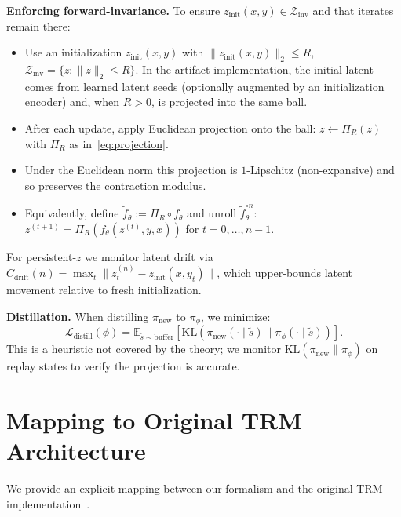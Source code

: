 \documentclass{article}
\theoremstyle{plain}
\theoremstyle{definition}
\theoremstyle{remark}
\newcommand{\E}{\mathbb{E}}
\newcommand{\KL}{\mathrm{KL}}
\begin{document}
\textbf{Enforcing forward-invariance.}
To ensure $z_{\mathrm{init}}(x,y) \in \mathcal{Z}_{\mathrm{inv}}$ and that iterates remain there:
\begin{itemize}
\item Use an initialization $z_{\mathrm{init}}(x,y)$ with $\|z_{\mathrm{init}}(x,y)\|_2 \le R$, $\mathcal{Z}_{\mathrm{inv}} = \{z : \|z\|_2 \le R\}$. In the artifact implementation, the initial latent comes from learned latent seeds (optionally augmented by an initialization encoder) and, when $R>0$, is projected into the same ball.
\item After each update, apply Euclidean projection onto the ball: $z \gets \Pi_R(z)$ with $\Pi_R$ as in~\eqref{eq:projection}.
\item Under the Euclidean norm this projection is $1$-Lipschitz (non-expansive) and so preserves the contraction modulus.
\item Equivalently, define $\tilde f_\theta := \Pi_R \circ f_\theta$ and unroll $\tilde f_\theta^{\circ n}$: $z^{(t+1)}=\Pi_R(f_\theta(z^{(t)},y,x))$ for $t=0,\dots,n-1$.
\end{itemize}

For persistent-$z$ we monitor latent drift via $\widehat{C}_{\mathrm{drift}}(n) = \max_t \|z_t^{(n)} - z_{\mathrm{init}}(x,y_t)\|$, which upper-bounds latent movement relative to fresh initialization.

\textbf{Distillation.}
When distilling $\pi_{\mathrm{new}}$ to $\pi_\phi$, we minimize:
\[
\mathcal{L}_{\mathrm{distill}}(\phi) = \E_{\tilde{s}\sim\text{buffer}}[\KL(\pi_{\mathrm{new}}(\cdot\mid\tilde{s}) \| \pi_\phi(\cdot\mid\tilde{s}))].
\]
This is a heuristic not covered by the theory; we monitor $\KL(\pi_{\mathrm{new}} \| \pi_\phi)$ on replay states to verify the projection is accurate.

\section{Mapping to Original TRM Architecture}
\label{app:trm_mapping}

We provide an explicit mapping between our formalism and the original TRM implementation~\citep{TRM2025}.
\end{document}

